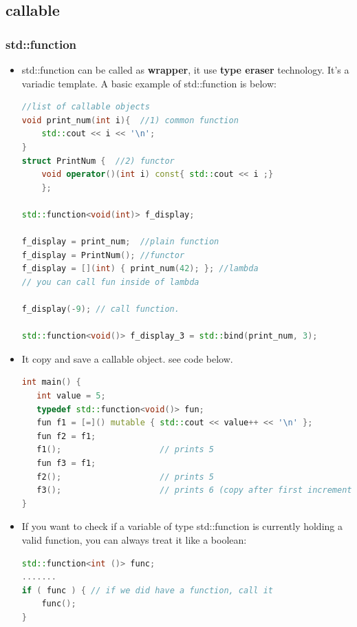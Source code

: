 \documentclass[a4paper,12pt,twoside]{book}
\begin{document}
\subsection{callable}
\subsubsection{std::function}
\begin{itemize}

\item std::function can be called as \textbf{wrapper}, it use \textbf{type eraser} technology. It's a variadic template. A basic example of std::function is below:
 
\begin{lstlisting}[frame=single, language=c++]
//list of callable objects
void print_num(int i){  //1) common function
    std::cout << i << '\n';
}
struct PrintNum {  //2) functor
    void operator()(int i) const{ std::cout << i ;}
    };

std::function<void(int)> f_display;

f_display = print_num;  //plain function
f_display = PrintNum(); //functor
f_display = [](int) { print_num(42); }; //lambda
// you can call fun inside of lambda

f_display(-9); // call function.

std::function<void()> f_display_3 = std::bind(print_num, 3);
\end{lstlisting}

\item It copy and save a callable object. see code below.
\begin{lstlisting}[frame=single, language=c++]
int main() {
   int value = 5;
   typedef std::function<void()> fun;
   fun f1 = [=]() mutable { std::cout << value++ << '\n' };
   fun f2 = f1;
   f1();                    // prints 5
   fun f3 = f1;
   f2();                    // prints 5
   f3();                    // prints 6 (copy after first increment)
}
\end{lstlisting}

\item If you want to check if a variable of type std::function is currently holding a valid function, you can always treat it like a boolean:
\begin{lstlisting}[frame=single, language=c++]
std::function<int ()> func;
.......
if ( func ) { // if we did have a function, call it
    func();
}
\end{lstlisting}


\end{itemize}
\end{document}
